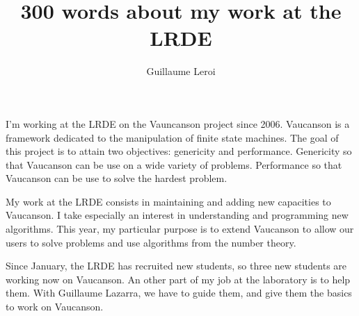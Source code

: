 \documentclass[a4paper, 12pt]{article}
\title{300 words about my work at the LRDE}
\author{Guillaume Leroi}
\begin{document}
\maketitle

I'm working at the LRDE on the Vauncanson project since
2006. Vaucanson is a framework dedicated to the manipulation of finite
state machines. The goal of this project is to attain two objectives:
genericity and performance. Genericity so that Vaucanson can be use
on a wide variety of problems. Performance so that Vaucanson can be
use to solve the hardest problem.

My work at the LRDE consists in maintaining and adding new capacities to
Vaucanson. I take especially an interest in understanding and
programming new algorithms. This year, my particular purpose is to
extend Vaucanson to allow our users to solve problems and use
algorithms from the number theory.

Since January, the LRDE has recruited new students, so three new
students are working now on Vaucanson. An other part of my job at the
laboratory is to help them. With Guillaume Lazarra, we have to guide
them, and give them the basics to work on Vaucanson.
\end{document}
